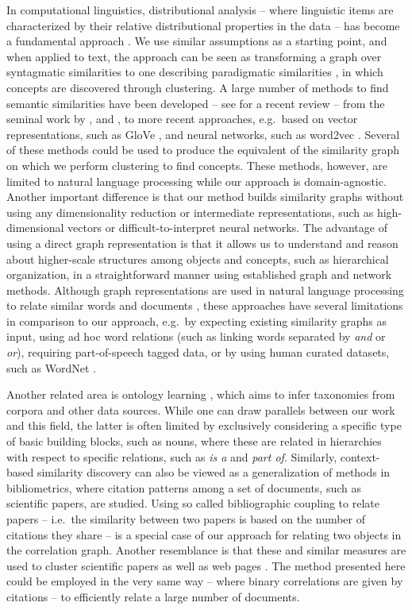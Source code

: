 \documentclass{kais}
\begin{document}
In computational linguistics, distributional analysis -- where linguistic items are characterized by
their relative distributional properties in the data -- has become a fundamental approach \cite{Harris-1970}. We use
similar assumptions as a starting point, and when applied to text, the approach can be seen as transforming a graph
over syntagmatic similarities to one describing paradigmatic similarities \cite{Sahlgren-2006}, in which
concepts are discovered through clustering. A large number of methods to find semantic similarities have been
developed -- see \cite{Harispe2015} for a recent review -- from the seminal work by , and , to more recent approaches, e.g.\ based on vector representations, such as GloVe 
\cite{Pennington2014}, and neural networks, such as word2vec \cite{Mikolov-2013}. 
Several of these methods could be used to produce the equivalent of the similarity graph on which we perform
clustering to find concepts. These methods, however, are limited to natural language processing while our approach 
is domain-agnostic. Another important difference is that our method builds similarity graphs without 
using any dimensionality reduction or intermediate representations, such as high-dimensional vectors 
or difficult-to-interpret neural networks. The advantage of using a direct graph representation is that it allows us to
understand and reason about higher-scale structures among objects and concepts, such as hierarchical organization, in a straightforward 
manner using established graph and network methods. Although graph representations are used in natural language processing to relate 
similar words and documents \cite{Mihalcea2011}, these approaches have several limitations in comparison to our 
approach, e.g.\ by expecting existing similarity graphs as input, using ad hoc word relations (such as linking words separated 
by \emph{and} or \emph{or}), requiring part-of-speech tagged data, or by using human curated datasets, such as WordNet \cite{miller1995wordnet}.

Another related area is ontology learning \cite{Wong2012ontology}, which aims to infer taxonomies 
from corpora and other data sources. While one can draw parallels between our work and this field, the latter is often limited 
by exclusively considering a specific type of basic building blocks, such as nouns, where these are related in 
 hierarchies with respect to specific relations, such as \emph{is a} and \emph{part of}. Similarly, context-based similarity
  discovery can also be viewed as a generalization of methods in bibliometrics, where citation patterns among a set of 
  documents, such as scientific papers, are studied. Using so called bibliographic coupling to relate papers  \cite{Kessler1963} 
  -- i.e.\ the similarity between two papers is based on the number of  citations they share -- is a special case of our approach 
  for relating two objects in the correlation graph. Another resemblance is that  these and similar measures are used to cluster 
  scientific papers \cite{Small1973} as well as web pages \cite{Larson96}. The method presented here could be employed in 
  the very same way -- where binary correlations are given by citations -- to efficiently relate a large number of documents.
\end{document}
